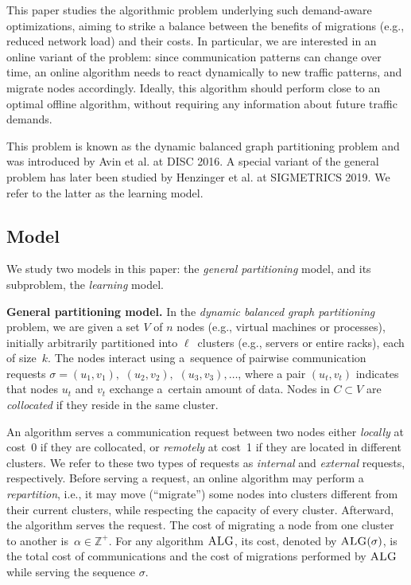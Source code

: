 \documentclass[a4paper,anonymous,USenglish]{lipics-v2019}
\newcommand{\ALG}{\textsc{ALG}\xspace}
\begin{document}
This paper studies the algorithmic problem underlying such demand-aware
optimizations, aiming to strike a balance between the benefits of migrations (e.g., reduced network load) and their costs.
In particular, we are interested in an online variant of the problem: since communication patterns can change over time, an online algorithm needs to react dynamically to new traffic patterns, and migrate nodes  accordingly.
Ideally, this algorithm should perform close to an optimal offline algorithm, without requiring any information about future traffic demands. 

This problem is known as the dynamic balanced graph partitioning problem and was introduced by Avin et al. \cite{repartition-disc, sidma-arxiv} at DISC 2016. A special variant of the general problem has later been studied by Henzinger et al. \cite{sigmetrics19_partitioning} at SIGMETRICS 2019.
We refer to the latter as the learning model.



\subsection{Model}

We study two models in this paper: the \emph{general partitioning} model, and its subproblem, the \emph{learning} model.

\noindent
\textbf{General partitioning model.}
In the \emph{dynamic balanced graph partitioning} problem, we are given a set $V$ of $n$ nodes 
(e.g., virtual machines or processes),
initially arbitrarily partitioned into $\ell$~clusters
(e.g., servers or entire racks),
each of size~$k$.
The nodes interact using
a~sequence of pairwise communication requests
$\sigma = (u_1,v_1),$ $(u_2,v_2),$ $(u_3,v_3), \ldots$,
where a pair $(u_t,v_t)$ indicates that nodes $u_t$ and $v_t$ exchange a~certain amount of data.
Nodes in $C \subset V$ are \emph{collocated}
if they reside in the same cluster.

An algorithm serves a communication request between two nodes
either \emph{locally} at cost~0
if they are collocated,
or \emph{remotely} at cost~1
if they are located in different clusters.
We refer to these two types of requests as \emph{internal}
and \emph{external} requests, respectively.
Before serving a request,
an online algorithm may perform a \emph{repartition},
i.e.,
it may move (``migrate'') some nodes into clusters different from their current clusters, while respecting the capacity of every cluster. 
Afterward, 
the algorithm serves the  request.
The cost of migrating a node from one cluster to another
is~$\alpha \in \mathbb{Z}^+$.
For any algorithm $\ALG$,
its cost,
denoted by $\ALG(\sigma)$,
is the total cost of communications and
the cost of migrations performed by $\ALG$ while serving the sequence $\sigma$.
\end{document}
